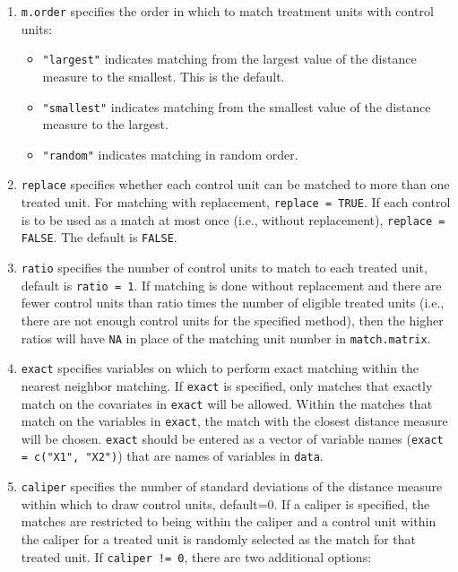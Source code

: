 \begin{enumerate}
\item \texttt{m.order}  specifies the order in which to match
  treatment units with control units:
  \begin{itemize}
  \item {\tt "largest"} indicates matching from the largest value of
    the distance measure to the smallest. This is the default.
  \item {\tt "smallest"} indicates matching from the smallest value of
    the distance measure to the largest.
  \item {\tt "random"} indicates matching in random order.
  \end{itemize}
\item \texttt{replace} specifies whether each control unit can be
  matched to more than one treated unit.  For matching with
  replacement, \texttt{replace = TRUE}.  If each control is to be used
  as a match at most once (i.e., without replacement), \texttt{replace
    = FALSE}. The default is {\tt FALSE}.
\item \texttt{ratio} specifies the number of control units to match to
  each treated unit, default is {\tt ratio = 1}.  If matching is done
  without replacement and there are fewer control units than ratio
  times the number of eligible treated units (i.e., there are not
  enough control units for the specified method), then the higher
  ratios will have \texttt{NA} in place of the matching unit number in
  \texttt{match.matrix}.
\item \texttt{exact} specifies variables on which to perform exact
  matching within the nearest neighbor matching.  If \texttt{exact} is
  specified, only matches that exactly match on the covariates in
  \texttt{exact} will be allowed.  Within the matches that match on
  the variables in \texttt{exact}, the match with the closest distance
  measure will be chosen.  \texttt{exact} should be entered as a
  vector of variable names (\texttt{exact = c("X1", "X2")}) that are
  names of variables in \texttt{data}.
\item \texttt{caliper} specifies the number of standard deviations of
  the distance measure within which to draw control units, default=0.
  If a caliper is specified, the matches are restricted to being
  within the caliper and a control unit within the caliper for a
  treated unit is randomly selected as the match for that treated
  unit.  If \texttt{caliper != 0}, there are two additional options:
  \begin{itemize} 

\end{itemize}
\end{enumerate}
